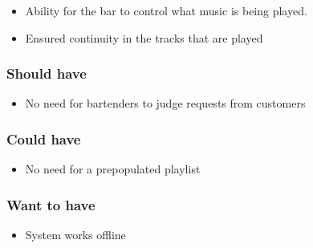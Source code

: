 \begin{itemize}
        \item Ability for the bar to control what music is being played.
        \item Ensured continuity in the tracks that are played
\end{itemize}

\subsubsection{Should have}

\begin{itemize}
        \item No need for bartenders to judge requests from customers
\end{itemize}

\subsubsection{Could have}

\begin{itemize}
        \item No need for a prepopulated playlist
\end{itemize}

\subsubsection{Want to have}

\begin{itemize}
        \item System works offline
\end{itemize}
